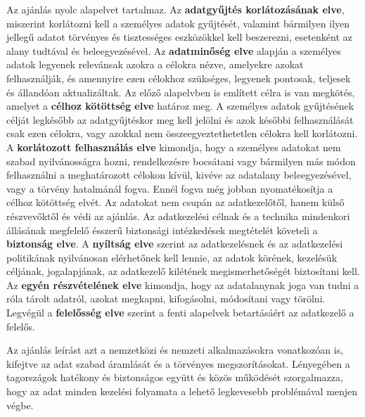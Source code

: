 Az ajánlás nyolc alapelvet tartalmaz. Az \textbf{adatgyűjtés korlátozásának elve}, miszerint korlátozni kell a személyes adatok gyűjtését, valamint bármilyen ilyen jellegű adatot törvényes és tisztességes eszközökkel kell beszerezni, esetenként az alany tudtával és beleegyezésével. Az \textbf{adatminőség elve} alapján a személyes adatok legyenek relevánsak azokra a célokra nézve, amelyekre azokat felhasználják, és amennyire ezen célokhoz szükséges, legyenek pontosak, teljesek és állandóan aktualizáltak. Az előző alapelvben is említett célra is van megkötés, amelyet a \textbf{célhoz kötöttség elve} határoz meg. A személyes adatok gyűjtésének célját legkésőbb az adatgyűjtéskor meg kell jelölni és azok későbbi felhasználását csak ezen célokra, vagy azokkal nem összeegyeztethetetlen célokra kell korlátozni. A \textbf{korlátozott felhasználás elve} kimondja, hogy a személyes adatokat nem szabad nyilvánosságra hozni, rendelkezésre bocsátani vagy bármilyen más módon felhasználni a meghatározott célokon kívül, kivéve az adatalany beleegyezésével, vagy a törvény hatalmánál fogva. Ennél fogva még jobban nyomatékosítja a célhoz kötöttség elvét. Az adatokat nem csupán az adatkezelőtől, hanem külső részvevőktől és védi az ajánlás. Az adatkezelési célnak és a technika mindenkori állásának megfelelő ésszerű biztonsági intézkedések megtételét követeli a \textbf{biztonság elve}. A \textbf{nyíltság elve} szerint az adatkezelésnek és az adatkezelési politikának nyilvánosan elérhetőnek kell lennie, az adatok körének, kezelésük céljának, jogalapjának, az adatkezelő kilétének megismerhetőségét biztosítani kell. Az \textbf{egyén részvételének elve} kimondja, hogy az adatalanynak joga van tudni a róla tárolt adatról, azokat megkapni, kifogásolni, módosítani vagy törölni. Legvégül a \textbf{felelősség elve} szerint a fenti alapelvek betartásáért az adatkezelő a felelős.

Az ajánlás leírást azt a nemzetközi és nemzeti alkalmazásokra vonatkozóan is, kifejtve az adat szabad áramlását és a törvényes megszorításokat. Lényegében a tagországok hatékony és biztonságos együtt és közös működését szorgalmazza, hogy az adat minden kezelési folyamata a lehető legkevesebb problémával menjen végbe. \cite{OECD}